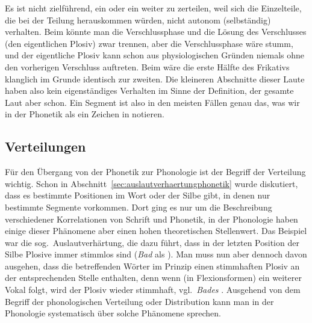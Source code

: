 
\newpage

Es ist \zB nicht zielführend, ein \textipa{[t]} oder ein \textipa{[s]} weiter zu zerteilen, weil sich die Einzelteile, die bei der Teilung herauskommen würden, nicht autonom (selbständig) verhalten.
Beim \textipa{[t]} könnte man die Verschlussphase und die Lösung des Verschlusses (den eigentlichen Plosiv) zwar trennen, aber die Verschlussphase wäre stumm, und der eigentliche Plosiv kann schon aus physiologischen Gründen niemals ohne den vorherigen Verschluss auftreten.
Beim \textipa{[s]} wäre die erste Hälfte des Frikativs klanglich im Grunde identisch zur zweiten.
Die kleineren Abschnitte dieser Laute haben also kein eigenständiges Verhalten im Sinne der Definition, der gesamte Laut aber schon.
Ein Segment ist also in den meisten Fällen genau das, was wir in der Phonetik als ein Zeichen in \textipa{[~]} notieren.

\subsection{Verteilungen}

\label{sec:verteilungen}

Für den Übergang von der Phonetik zur Phonologie ist der Begriff der Verteilung wichtig.
Schon in Abschnitt~\ref{sec:auslautverhaertungphonetik} wurde diskutiert, dass es bestimmte Positionen im Wort oder der Silbe gibt, in denen nur bestimmte Segmente vorkommen.
Dort ging es nur um die Beschreibung verschiedener Korrelationen von Schrift und Phonetik, in der Phonologie haben einige dieser Phänomene aber einen hohen theoretischen Stellenwert.
Das Beispiel war die sog.\ Auslautverhärtung, die dazu führt, dass in der letzten Position der Silbe Plosive immer stimmlos sind (\textit{Bad} als \textipa{[ba:t]}).
Man muss nun aber dennoch davon ausgehen, dass die betreffenden Wörter im Prinzip einen stimmhaften Plosiv an der entsprechenden Stelle enthalten, denn wenn (\zB in Flexionsformen) ein weiterer Vokal folgt, wird der Plosiv wieder stimmhaft, vgl.\ \textit{Bades} \textipa{[ba:d@s]}.
Ausgehend von dem Begriff der phonologischen Verteilung oder Distribution kann man in der Phonologie systematisch über solche Phänomene sprechen.


